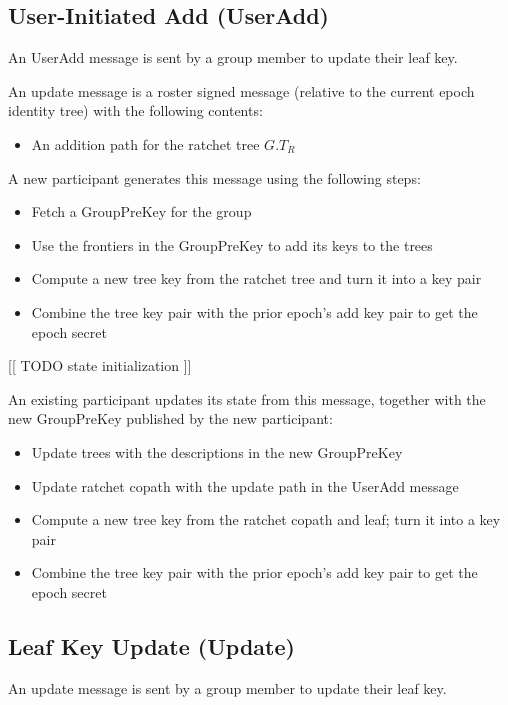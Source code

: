 \documentclass[11pt, oneside]{article}
\begin{document}
\subsection{User-Initiated Add (UserAdd)}

An UserAdd message is sent by a group member to update their leaf key.  

An update message is a roster signed message (relative to the current epoch identity tree) with the following contents:

\begin{itemize}
\item{An addition path for the ratchet tree $G.T_R$}
\end{itemize}

A new participant generates this message using the following steps:

\begin{itemize}
\item{Fetch a GroupPreKey for the group}
\item{Use the frontiers in the GroupPreKey to add its keys to the trees}
\item{Compute a new tree key from the ratchet tree and turn it into a key pair}
\item{Combine the tree key pair with the prior epoch's add key pair to get the epoch secret}
\end{itemize}

[[ TODO state initialization ]]

An existing participant updates its state from this message, together with the new GroupPreKey published by the new participant:

\begin{itemize}
\item{Update trees with the descriptions in the new GroupPreKey}
\item{Update ratchet copath with the update path in the UserAdd message}
\item{Compute a new tree key from the ratchet copath and leaf; turn it into a key pair}
\item{Combine the tree key pair with the prior epoch's add key pair to get the epoch secret}
\end{itemize}


\subsection{Leaf Key Update (Update)}

An update message is sent by a group member to update their leaf key.  
\end{document}
